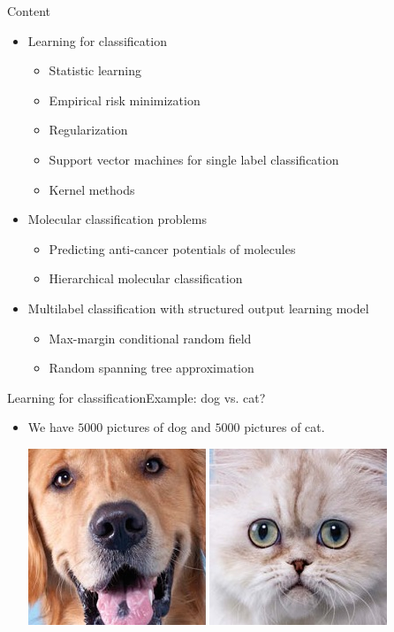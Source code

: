 \documentclass[first=dgreen,second=purple,logo=yellowexc]{aaltoslides}
\begin{document}
{\iffalse
\begin{frame}{Content}
	\begin{itemize}
		\item Learning for classification
		\begin{itemize}
			\footnotesize
			\item Statistic learning
			\item Empirical risk minimization
			\item Regularization
			\item Support vector machines for single label classification
			\item Kernel methods 
		\end{itemize}
		\item Molecular classification problems
		\begin{itemize}
			\footnotesize
			\item Predicting anti-cancer potentials of molecules
			\item Hierarchical molecular classification
		\end{itemize}
		\item Multilabel classification with structured output learning model
		\begin{itemize}
			\item Max-margin conditional random field
			\item Random spanning tree approximation
		\end{itemize}
	\end{itemize}
\end{frame}
\begin{frame}{Learning for classification}{Example: dog vs. cat?}
	\begin{itemize}
		\item We have $5000$ pictures of dog and $5000$ pictures of cat.
		\begin{center}
			\includegraphics[scale=0.3]{./figures/dog.jpg}
			\text{     }
			\includegraphics[scale=0.3]{./figures/cat.jpg}

\end{center}
\end{itemize}
\end{frame}}
\end{document}
